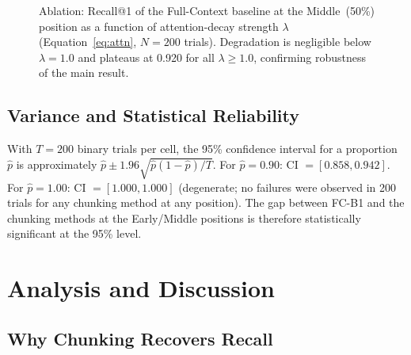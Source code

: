 \documentclass[sigconf,nonacm]{acmart}
\begin{document}
\begin{figure}[t]
\centering
{}
\caption{Ablation: Recall@1 of the Full-Context baseline at the Middle~(50\%)
  position as a function of attention-decay strength $\lambda$
  (Equation~\ref{eq:attn}, $N=200$ trials).
  Degradation is negligible below $\lambda=1.0$ and plateaus at 0.920 for
  all $\lambda \geq 1.0$, confirming robustness of the main result.}
\label{fig:ablation}
\end{figure}

\subsection{Variance and Statistical Reliability}

With $T = 200$ binary trials per cell, the 95\% confidence interval for a
proportion $\hat{p}$ is approximately $\hat{p} \pm 1.96\sqrt{\hat{p}(1-\hat{p})/T}$.
For $\hat{p} = 0.90$: CI $= [0.858, 0.942]$.
For $\hat{p} = 1.00$: CI $= [1.000, 1.000]$ (degenerate; no failures were
observed in 200 trials for any chunking method at any position).
The gap between FC-B1 and the chunking methods at the Early/Middle positions
is therefore statistically significant at the 95\% level.

\section{Analysis and Discussion}
\label{sec:discussion}

\subsection{Why Chunking Recovers Recall}
\end{document}
